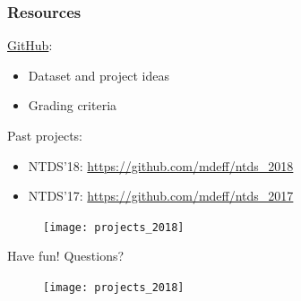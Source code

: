 \documentclass[aspectratio=169]{beamer}
\begin{document}

\begin{frame}
	\frametitle{Resources}
	\href{https://github.com/mdeff/ntds_2019}{GitHub}:
	\begin{itemize}
		\item Dataset and project ideas
		\item Grading criteria
	\end{itemize}
	\vfill
	Past projects:
	\begin{itemize}
		\item NTDS'18: \url{https://github.com/mdeff/ntds_2018}
		\item NTDS'17: \url{https://github.com/mdeff/ntds_2017}
	\end{itemize}
\end{frame}


\begin{frame}
	\begin{figure}
		\centering
		\texttt{[image: projects\_2018]}
	\end{figure}
	\begin{center}
		\Huge Have fun!
		\hspace{2em}
		\Huge Questions?
	\end{center}
	\begin{figure}
		\centering
		\texttt{[image: projects\_2018]}
	\end{figure}
\end{frame}

\end{document}
